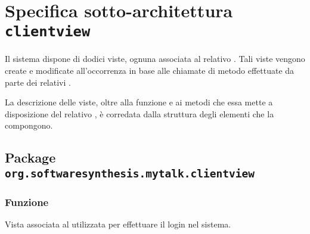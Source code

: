 \clearpage

\section{Specifica sotto-architettura \texttt{clientview}}\label{sec:clientviewarchitecture}
Il sistema dispone di dodici viste, ognuna associata al relativo . Tali viste vengono create e modificate all'occorrenza in base alle chiamate di metodo effettuate da parte dei relativi .

La descrizione delle viste, oltre alla funzione e ai metodi che essa mette a disposizione del relativo , è corredata dalla struttura degli elementi che la compongono.

\subsection{Package \texttt{org.softwaresynthesis.mytalk.clientview}}

\subsubsection*{Funzione}
Vista associata al   utilizzata per effettuare il login nel sistema.

